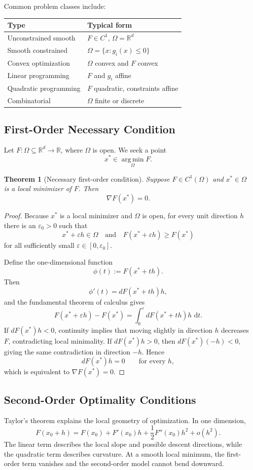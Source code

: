 \documentclass[12pt,oneside]{book}
\numberwithin{equation}{section}
\theoremstyle{definition}
\theoremstyle{plain}
\newtheorem{theorem}{Theorem}[section]
\theoremstyle{remark}
\newcommand{\R}{\mathbb{R}}
\newcommand{\argmin}{\operatorname*{arg\,min}}
\newcommand{\dd}{\,\mathrm{d}}
\begin{document}
Common problem classes include:
\begin{center}
\begin{tabular}{@{}ll@{}}
\toprule
\textbf{Type} & \textbf{Typical form}\\
\midrule
Unconstrained smooth & $F\in C^1$, $\Omega=\R^d$\\
Smooth constrained & $\Omega=\{x:g_i(x)\leq0\}$\\
Convex optimization & $\Omega$ convex and $F$ convex\\
Linear programming & $F$ and $g_i$ affine\\
Quadratic programming & $F$ quadratic, constraints affine\\
Combinatorial & $\Omega$ finite or discrete\\
\bottomrule
\end{tabular}
\end{center}

\subsection{First-Order Necessary Condition}
Let $F\colon\Omega\subseteq\R^d\to\R$, where $\Omega$ is open. We seek a point
\[
x^*\in\argmin_{\Omega}F.
\]

\begin{theorem}[Necessary first-order condition]
Suppose $F\in C^1(\Omega)$ and $x^*\in\Omega$ is a local minimizer of $F$. Then
\[
\nabla F(x^*)=0.
\]
\end{theorem}

\begin{proof}
Because $x^*$ is a local minimizer and $\Omega$ is open, for every unit direction $h$ there is an $\varepsilon_0>0$ such that
\[
x^*+\varepsilon h\in\Omega
\quad\text{and}\quad
F(x^*+\varepsilon h)\geq F(x^*)
\]
for all sufficiently small $\varepsilon\in[0,\varepsilon_0]$.

Define the one-dimensional function
\[
\phi(t):=F(x^*+th).
\]
Then
\[
\phi'(t)=dF(x^*+th)h,
\]
and the fundamental theorem of calculus gives
\[
F(x^*+\varepsilon h)-F(x^*)
=\int_0^\varepsilon dF(x^*+th)h\,\dd t.
\]
If $dF(x^*)h<0$, continuity implies that moving slightly in direction $h$ decreases $F$, contradicting local minimality. If $dF(x^*)h>0$, then $dF(x^*)(-h)<0$, giving the same contradiction in direction $-h$. Hence
\[
dF(x^*)h=0
\qquad\text{for every }h,
\]
which is equivalent to $\nabla F(x^*)=0$.
\end{proof}

\subsection{Second-Order Optimality Conditions}
Taylor's theorem explains the local geometry of optimization. In one dimension,
\[
F(x_0+h)
=F(x_0)+F'(x_0)h
+\frac{1}{2}F''(x_0)h^2+o(h^2).
\]
The linear term describes the local slope and possible descent directions, while the quadratic term describes curvature. At a smooth local minimum, the first-order term vanishes and the second-order model cannot bend downward.
\end{document}
